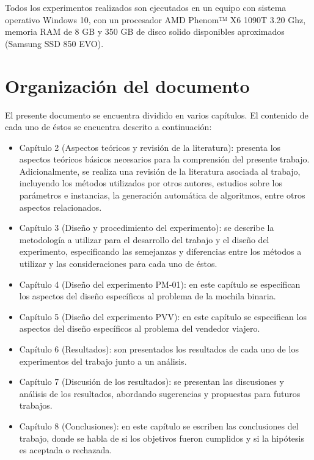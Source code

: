 Todos los experimentos realizados son ejecutados en un equipo con sistema operativo Windows 10, con un procesador AMD Phenom™ X6 1090T 3.20 Ghz, memoria RAM de 8 GB y 350 GB de disco solido disponibles aproximados (Samsung SSD 850 EVO).

\section{Organización del documento}
\label{intro:organizacion}

El presente documento se encuentra dividido en varios capítulos. El contenido de cada uno de éstos se encuentra descrito a continuación:

\begin{itemize}
    \item Capítulo 2 (Aspectos teóricos y revisión de la literatura): presenta los aspectos teóricos básicos necesarios para la comprensión del presente trabajo. Adicionalmente, se realiza una revisión de la literatura asociada al trabajo, incluyendo los métodos utilizados por otros autores, estudios sobre los parámetros e instancias, la generación automática de algoritmos, entre otros aspectos relacionados.
    \item Capítulo 3 (Diseño y procedimiento del experimento): se describe la metodología a utilizar para el desarrollo del trabajo y el diseño del experimento, especificando las semejanzas y diferencias entre los métodos a utilizar y las consideraciones para cada uno de éstos.
    \item Capítulo 4 (Diseño del experimento PM-01): en este capítulo se especifican los aspectos del diseño específicos al problema de la mochila binaria.
    \item Capítulo 5 (Diseño del experimento PVV): en este capítulo se especifican los aspectos del diseño específicos al problema del vendedor viajero.
    \item Capítulo 6 (Resultados): son presentados los resultados de cada uno de los experimentos del trabajo junto a un análisis.
    \item Capítulo 7 (Discusión de los resultados): se presentan las discusiones y análisis de los resultados, abordando sugerencias y propuestas para futuros trabajos.
    \item Capítulo 8 (Conclusiones): en este capítulo se escriben las conclusiones del trabajo, donde se habla de si los objetivos fueron cumplidos y si la hipótesis es aceptada o rechazada.
\end{itemize}


